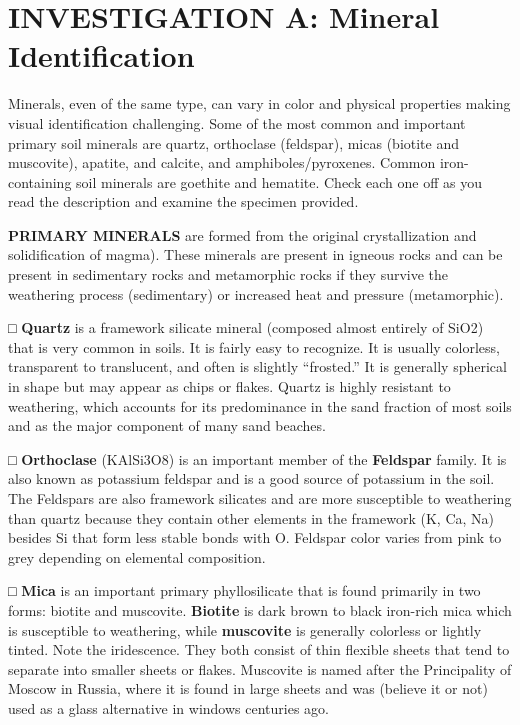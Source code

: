 \documentclass[
  letterpaper,
  twocolumn,
  portrait]{scrbook}
\begin{document}
\hypertarget{investigation-a-mineral-identification}{%
\section{INVESTIGATION A: Mineral
Identification}\label{investigation-a-mineral-identification}}

Minerals, even of the same type, can vary in color and physical
properties making visual identification challenging. Some of the most
common and important primary soil minerals are quartz, orthoclase
(feldspar), micas (biotite and muscovite), apatite, and calcite, and
amphiboles/pyroxenes. Common iron-containing soil minerals are goethite
and hematite. Check each one off as you read the description and examine
the specimen provided.

\textbf{PRIMARY MINERALS} are formed from the original crystallization
and solidification of magma). These minerals are present in igneous
rocks and can be present in sedimentary rocks and metamorphic rocks if
they survive the weathering process (sedimentary) or increased heat and
pressure (metamorphic).

□ \textbf{Quartz} is a framework silicate mineral (composed almost
entirely of SiO2) that is very common in soils. It is fairly easy to
recognize. It is usually colorless, transparent to translucent, and
often is slightly ``frosted.'' It is generally spherical in shape but
may appear as chips or flakes. Quartz is highly resistant to weathering,
which accounts for its predominance in the sand fraction of most soils
and as the major component of many sand beaches.

□ \textbf{Orthoclase} (KAlSi3O8) is an important member of the
\textbf{Feldspar} family. It is also known as potassium feldspar and is
a good source of potassium in the soil. The Feldspars are also framework
silicates and are more susceptible to weathering than quartz because
they contain other elements in the framework (K, Ca, Na) besides Si that
form less stable bonds with O. Feldspar color varies from pink to grey
depending on elemental composition.

□ \textbf{Mica} is an important primary phyllosilicate that is found
primarily in two forms: biotite and muscovite. \textbf{Biotite} is dark
brown to black iron-rich mica which is susceptible to weathering, while
\textbf{muscovite} is generally colorless or lightly tinted. Note the
iridescence. They both consist of thin flexible sheets that tend to
separate into smaller sheets or flakes. Muscovite is named after the
Principality of Moscow in Russia, where it is found in large sheets and
was (believe it or not) used as a glass alternative in windows centuries
ago.
\end{document}
